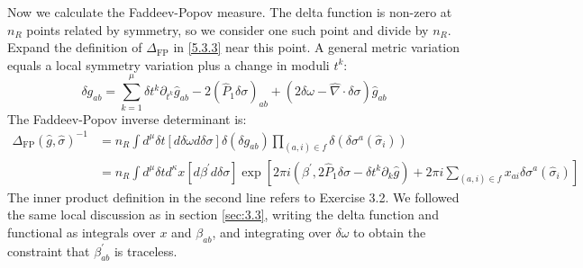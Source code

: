 Now we calculate the Faddeev-Popov measure. The delta function is non-zero at $n_R$ points related by symmetry, so we consider one such point and divide by $n_R$. Expand the definition of $\Delta_{\mathrm{FP}}$ in \eqref{5.3.3} near this point. A general metric variation equals a local symmetry variation plus a change in moduli $t^k$:
\begin{equation}
	\delta g_{a b}=\sum_{k=1}^{\mu} \delta t^{k} \partial_{t^{k}} \hat{g}_{a b}-2\left(\hat{P}_{1} \delta \sigma\right)_{a b}+(2 \delta \omega-\hat{\nabla} \cdot \delta \sigma) \hat{g}_{a b}\label{5.3.5}
\end{equation}
The Faddeev-Popov inverse determinant is:
\begin{equation}
	\begin{aligned}
		\Delta_{\mathrm{FP}}(\hat{g}, \hat{\sigma})^{-1} &=n_{R} \int d^{\mu} \delta t[d \delta \omega d \delta \sigma] \delta\left(\delta g_{a b}\right) \prod_{(a, i) \in f} \delta\left(\delta \sigma^{a}\left(\hat{\sigma}_{i}\right)\right)\\
		&=n_{R}  \int d^{\mu} \delta t d^{\kappa} x\left[d \beta^{\prime} d \delta \sigma\right]  \exp \left[2 \pi i\left(\beta^{\prime}, 2 \hat{P}_{1} \delta \sigma-\delta t^{k} \partial_{k} \hat{g}\right)+2 \pi i \sum_{(a, i) \in f} x_{a i} \delta \sigma^{a}\left(\hat{\sigma}_{i}\right)\right]
	\end{aligned}\label{5.3.6}
\end{equation}
The inner product definition in the second line refers to Exercise 3.2. We followed the same local discussion as in section \ref{sec:3.3}, writing the delta function and functional as integrals over $x$ and $\beta_{ab}$, and integrating over $\delta \omega$ to obtain the constraint that $\beta_{ab}^{\prime}$ is traceless.

